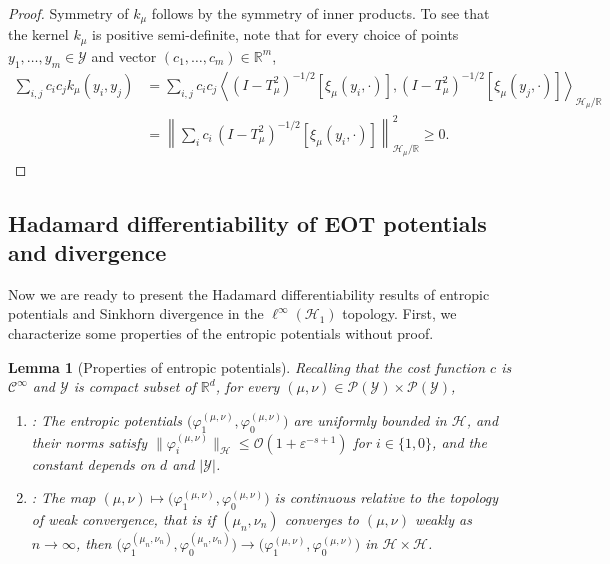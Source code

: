 \documentclass{article}
\theoremstyle{plain}
\newtheorem{lemma}[theorem]{Lemma}
\theoremstyle{definition}
\theoremstyle{remark}
\newcommand{\R}{\mathbb{R}}
\newcommand{\of}[1]{\left(#1\right)}
\newcommand{\abs}[1]{\left|#1\right|}
\newcommand{\cH}{\mathcal{H}}
\newcommand{\cP}{\mathcal{P}}
\newcommand{\cC}{\mathcal{C}}
\newcommand{\cO}{\mathcal{O}}
\newcommand{\cY}{\mathcal{Y}}
\newcommand{\1}{\mathbbm{1}}
\newcommand{\eps}{\varepsilon}
\newcommand{\iprod}[1]{\left\langle #1 \right\rangle}
\newcommand{\norm}[1]{\left \| #1 \right \|}
\theoremstyle{plain}
\theoremstyle{definition}
\begin{document}
\begin{proof}
    Symmetry of $k_\mu$ follows by the symmetry of inner products. To see that the kernel $k_\mu$ is positive semi-definite, note that for every choice of points $y_1, \dots, y_m \in \cY$ and vector $(c_1, \dots, c_m) \in \R^m$,
    \begin{align*}
        \sum_{i,j} c_i c_j k_\mu(y_i, y_j) &= \sum_{i,j} c_i c_j \iprod{(I - T_\mu^2)^{-1/2} [\xi_\mu(y_i, \cdot)] , (I - T_\mu^2)^{-1/2} [\xi_\mu(y_j, \cdot)] }_{\cH_\mu / \R}\\
        &=  \norm{ \sum_i c_i \, (I - T_\mu^2)^{-1/2} [\xi_\mu(y_i, \cdot)] }_{\cH_\mu/\R}^2 \ge 0.
    \end{align*}
\end{proof}

\subsection{Hadamard differentiability of EOT potentials and divergence}\label{appendix:hadamard_diff_sinkhorn_objects}

Now we are ready to present the Hadamard differentiability results of entropic potentials and Sinkhorn divergence in the $\ell^\infty(\cH_1)$ topology. First, we characterize some properties of the entropic potentials without proof.

\begin{lemma}[Properties of entropic potentials]\label{lem:EOT_potentials_properties}
    Recalling that the cost function $c $ is $ \cC^\infty$ and $\cY$ is compact subset of $\R^d$, for every $(\mu, \nu) \in \cP(\cY) \times \cP(\cY)$,
    \begin{enumerate}
        \item \citet[Thm.~2]{genevay2019sample}: The entropic potentials $\big({\varphi_1^{(\mu, \nu)}, \varphi_0^{(\mu, \nu)}}\big)$ are uniformly bounded in $\cH$, and their norms satisfy $\big \|{\varphi_i^{(\mu, \nu)}}\big\|_{\cH} \leq \cO\of{1 + \eps^{-s+1}}$ for $i \in \{1,0\}$, and the constant depends on $d$ and $\abs{\cY}$. 
        \item \citet[Lem.~1]{goldfeld2024limit}: The map $(\mu, \nu) \mapsto \big({\varphi_1^{(\mu, \nu)}, \varphi_0^{(\mu, \nu)}}\big)$ is continuous relative to the topology of weak convergence, that is if $(\mu_n, \nu_n)$ converges to $(\mu, \nu)$ weakly as $n \to \infty$, then $\big({\varphi_1^{(\mu_n, \nu_n)}, \varphi_0^{(\mu_n, \nu_n)}}\big) \to \big({\varphi_1^{(\mu, \nu)}, \varphi_0^{(\mu, \nu)}}\big)$ in $\cH \times \cH$. 
    \end{enumerate}
\end{lemma}
\end{document}
